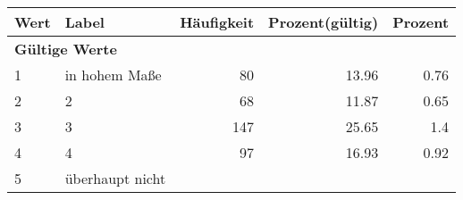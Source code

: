      \begin{longtable}{lXrrr}
     \toprule
     \textbf{Wert} & \textbf{Label} & \textbf{Häufigkeit} & \textbf{Prozent(gültig)} & \textbf{Prozent} \\
     \endhead
     \midrule
     \multicolumn{5}{l}{\textbf{Gültige Werte}}\\

     1 &
     \multicolumn{1}{X}{ in hohem Maße   } &


       \num{80} &
       \num[round-mode=places,round-precision=2]{13.96} &
         \num[round-mode=places,round-precision=2]{0.76} \\

     2 &
     \multicolumn{1}{X}{ 2   } &


       \num{68} &
       \num[round-mode=places,round-precision=2]{11.87} &
         \num[round-mode=places,round-precision=2]{0.65} \\

     3 &
     \multicolumn{1}{X}{ 3   } &


       \num{147} &
       \num[round-mode=places,round-precision=2]{25.65} &
         \num[round-mode=places,round-precision=2]{1.4} \\

     4 &
     \multicolumn{1}{X}{ 4   } &


       \num{97} &
       \num[round-mode=places,round-precision=2]{16.93} &
         \num[round-mode=places,round-precision=2]{0.92} \\

     5 &
     \multicolumn{1}{X}{ überhaupt nicht   } &



\end{longtable}
